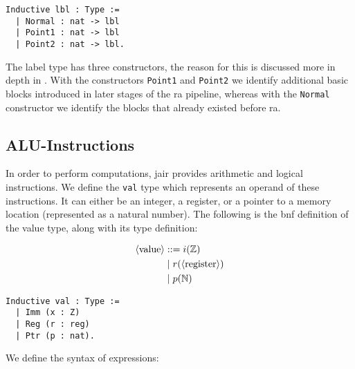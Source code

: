 \begin{lstlisting}[style=Rocq]
Inductive lbl : Type :=
  | Normal : nat -> lbl
  | Point1 : nat -> lbl
  | Point2 : nat -> lbl.
\end{lstlisting}

The label type has three constructors, the reason for this is discussed more in depth in . With the constructors \texttt{Point1} and \texttt{Point2} we identify additional basic blocks introduced in later stages of the \gls{ra} pipeline, whereas with the \texttt{Normal} constructor we identify the blocks that already existed before \gls{ra}.

\subsection{ALU-Instructions}

In order to perform computations, \gls{jair} provides arithmetic and logical instructions.
We define the \texttt{val} type which represents an operand of these instructions. It can either be an integer, a register, or a pointer to a memory location (represented as a natural number). The following is the \gls{bnf} definition of the value type, along with its type definition:

\begin{minipage}{0.45\linewidth}
\begin{align*}
\langle\text{value}\rangle &::= i( \mathbb Z ) \\
&\mid r( \langle\text{register}\rangle ) \\
&\mid p( \mathbb N ) \\
\end{align*}
\end{minipage}
\hfill
\begin{minipage}{0.45\linewidth}
\begin{lstlisting}[style=Rocq]
Inductive val : Type :=
  | Imm (x : Z)
  | Reg (r : reg)
  | Ptr (p : nat).
\end{lstlisting}
\end{minipage}

We define the syntax of expressions:

